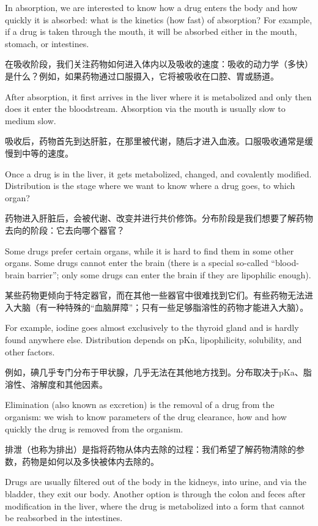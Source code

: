 \documentclass[dvipsnames, svgnames,a4paper,11pt]{article}
\begin{document}
In absorption, we are interested to know how a drug enters the body and how quickly it is absorbed: what is the kinetics (how fast) of absorption? For example, if a drug is taken through the mouth, it will be absorbed either in the mouth, stomach, or intestines.

在吸收阶段，我们关注药物如何进入体内以及吸收的速度：吸收的动力学（多快）是什么？例如，如果药物通过口服摄入，它将被吸收在口腔、胃或肠道。

After absorption, it first arrives in the liver where it is metabolized and only then does it enter the bloodstream. Absorption via the mouth is usually slow to medium slow.

吸收后，药物首先到达肝脏，在那里被代谢，随后才进入血液。口服吸收通常是缓慢到中等的速度。

Once a drug is in the liver, it gets metabolized, changed, and covalently modified. Distribution is the stage where we want to know where a drug goes, to which organ?

药物进入肝脏后，会被代谢、改变并进行共价修饰。分布阶段是我们想要了解药物去向的阶段：它去向哪个器官？

Some drugs prefer certain organs, while it is hard to find them in some other organs. Some drugs cannot enter the brain (there is a special so-called “blood-brain barrier”; only some drugs can enter the brain if they are lipophilic enough).

某些药物更倾向于特定器官，而在其他一些器官中很难找到它们。有些药物无法进入大脑（有一种特殊的“血脑屏障”；只有一些足够脂溶性的药物才能进入大脑）。

For example, iodine goes almost exclusively to the thyroid gland and is hardly found anywhere else. Distribution depends on pKa, lipophilicity, solubility, and other factors.

例如，碘几乎专门分布于甲状腺，几乎无法在其他地方找到。分布取决于pKa、脂溶性、溶解度和其他因素。

Elimination (also known as excretion) is the removal of a drug from the organism: we wish to know parameters of the drug clearance, how and how quickly the drug is removed from the organism.

排泄（也称为排出）是指将药物从体内去除的过程：我们希望了解药物清除的参数，药物是如何以及多快被体内去除的。

Drugs are usually filtered out of the body in the kidneys, into urine, and via the bladder, they exit our body. Another option is through the colon and feces after modification in the liver, where the drug is metabolized into a form that cannot be reabsorbed in the intestines.
\end{document}
